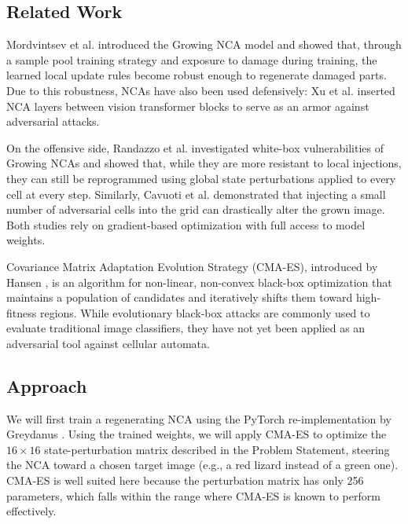 \documentclass{article}
\begin{document}
\subsection*{Related Work}

Mordvintsev et al. \cite{mordvintsev2020growing} introduced the Growing NCA model and showed that, through a sample pool training strategy and exposure to damage during training, the learned local update rules become robust enough to regenerate damaged parts. Due to this robustness, NCAs have also been used defensively: Xu et al. \cite{xu2024adanca} inserted NCA layers between vision transformer blocks to serve as an armor against adversarial attacks.

On the offensive side, Randazzo et al. \cite{randazzo2021adversarial} investigated white-box vulnerabilities of Growing NCAs and showed that, while they are more resistant to local injections, they can still be reprogrammed using global state perturbations applied to every cell at every step. Similarly, Cavuoti et al. \cite{cavuoti2022adversarial} demonstrated that injecting a small number of adversarial cells into the grid can drastically alter the grown image. Both studies rely on gradient-based optimization with full access to model weights.

Covariance Matrix Adaptation Evolution Strategy (CMA-ES), introduced by Hansen \cite{hansen2001cmaes}, is an algorithm for non-linear, non-convex black-box optimization that maintains a population of candidates and iteratively shifts them toward high-fitness regions. While evolutionary black-box attacks are commonly used to evaluate traditional image classifiers, they have not yet been applied as an adversarial tool against cellular automata.


\subsection*{Approach}


We will first train a regenerating NCA using the PyTorch re-implementation by Greydanus \cite{greydanus2022growing}. Using the trained weights, we will apply CMA-ES \cite{hansen2001cmaes} to optimize the $16 \times 16$ state-perturbation matrix described in the Problem Statement, steering the NCA toward a chosen target image (e.g., a red lizard instead of a green one). CMA-ES is well suited here because the perturbation matrix has only 256 parameters, which falls within the range where CMA-ES is known to perform effectively.
\end{document}
